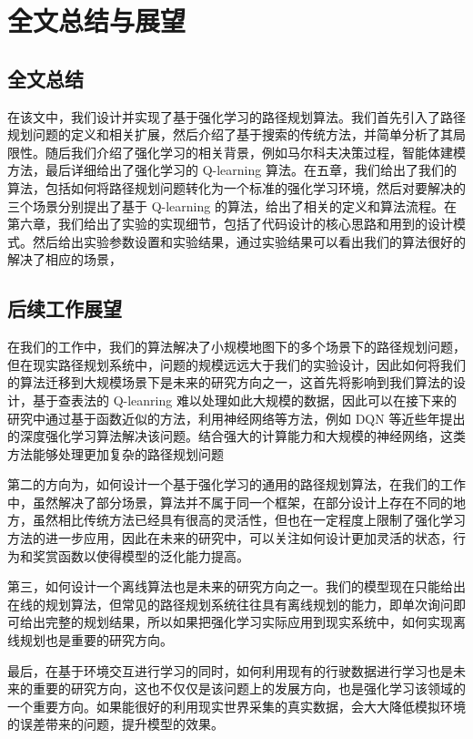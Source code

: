 \documentclass{standalone}
\begin{document}
\chapter{全文总结与展望}
\section{全文总结}
在该文中，我们设计并实现了基于强化学习的路径规划算法。我们首先引入了路径规划问题的定义和相关扩展，然后介绍了基于搜索的传统方法，并简单分析了其局限性。随后我们介绍了强化学习的相关背景，例如马尔科夫决策过程，智能体建模方法，最后详细给出了强化学习的 Q-learning 算法。在五章，我们给出了我们的算法，包括如何将路径规划问题转化为一个标准的强化学习环境，然后对要解决的三个场景分别提出了基于 Q-learning 的算法，给出了相关的定义和算法流程。在第六章，我们给出了实验的实现细节，包括了代码设计的核心思路和用到的设计模式。然后给出实验参数设置和实验结果，通过实验结果可以看出我们的算法很好的解决了相应的场景，
\section{后续工作展望}
在我们的工作中，我们的算法解决了小规模地图下的多个场景下的路径规划问题，但在现实路径规划系统中，问题的规模远远大于我们的实验设计，因此如何将我们的算法迁移到大规模场景下是未来的研究方向之一，这首先将影响到我们算法的设计，基于查表法的 Q-leanring 难以处理如此大规模的数据，因此可以在接下来的研究中通过基于函数近似的方法，利用神经网络等方法，例如 DQN 等近些年提出的深度强化学习算法解决该问题。结合强大的计算能力和大规模的神经网络，这类方法能够处理更加复杂的路径规划问题\par
第二的方向为，如何设计一个基于强化学习的通用的路径规划算法，在我们的工作中，虽然解决了部分场景，算法并不属于同一个框架，在部分设计上存在不同的地方，虽然相比传统方法已经具有很高的灵活性，但也在一定程度上限制了强化学习方法的进一步应用，因此在未来的研究中，可以关注如何设计更加灵活的状态，行为和奖赏函数以使得模型的泛化能力提高。\par
第三，如何设计一个离线算法也是未来的研究方向之一。我们的模型现在只能给出在线的规划算法，但常见的路径规划系统往往具有离线规划的能力，即单次询问即可给出完整的规划结果，所以如果把强化学习实际应用到现实系统中，如何实现离线规划也是重要的研究方向。\par
最后，在基于环境交互进行学习的同时，如何利用现有的行驶数据进行学习也是未来的重要的研究方向，这也不仅仅是该问题上的发展方向，也是强化学习该领域的一个重要方向。如果能很好的利用现实世界采集的真实数据，会大大降低模拟环境的误差带来的问题，提升模型的效果。
\end{document}
